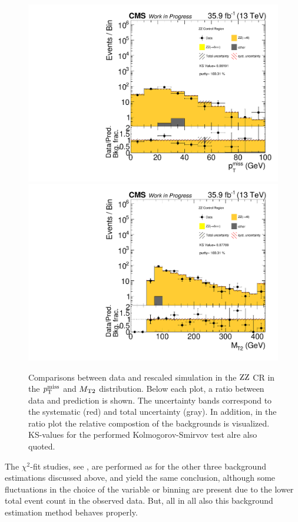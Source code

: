 \begin{figure}[tbp]
 \centering
 \includegraphics[width=\pairwidth]{figures/plots_CR_zz/CRZZ_LL_nom_met_log}
 \includegraphics[width=\pairwidth]{figures/plots_CR_zz/CRZZ_LL_nom_mt2_log}
 \caption{Comparisons between data and rescaled simulation in the $\mathrm{Z}\mathrm{Z}$ CR in the $p_{\mathrm{T}}^\text{miss}$ and $M_{\mathrm{T2}}$ distribution. Below each plot, a ratio between data and prediction is shown. The uncertainty bands correspond to the systematic (red) and total uncertainty (gray). In addition, in the ratio plot the relative compostion of the backgrounds is visualized. KS-values for the performed Kolmogorov-Smirvov test alre also quoted.}
 \label{fig:CRZZ}
\end{figure}
The $\chi^2$-fit studies, see , are performed as for the other three background estimations discussed above, and yield the same conclusion, although some fluctuations in the choice of the variable or binning are present due to the lower total event count in the observed data. But, all in all also this background estimation method behaves properly.
